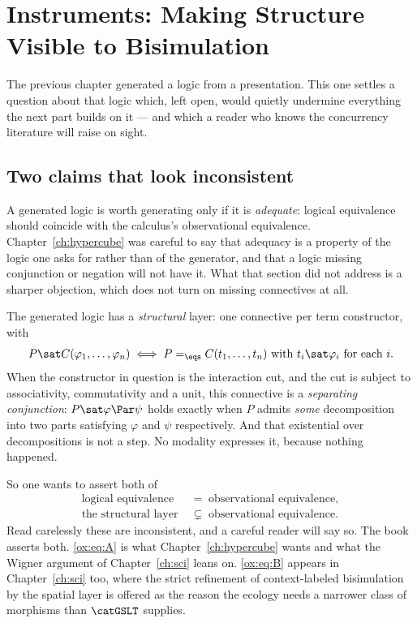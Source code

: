 \chapter{Instruments: Making Structure Visible to Bisimulation}
\label{ch:obsext}

The previous chapter generated a logic from a presentation. This one settles a
question about that logic which, left open, would quietly undermine everything the
next part builds on it --- and which a reader who knows the concurrency literature
will raise on sight.

\section{Two claims that look inconsistent}
\label{ox:sec:contradiction}

A generated logic is worth generating only if it is \emph{adequate}: logical
equivalence should coincide with the calculus's observational equivalence.
Chapter~\ref{ch:hypercube} was careful to say that adequacy is a property of the
logic one asks for rather than of the generator, and that a logic missing
conjunction or negation will not have it. What that section did not address is a
sharper objection, which does not turn on missing connectives at all.

The generated logic has a \emph{structural} layer: one connective per term
constructor, with
\[
  P \sat C(\varphi_1,\dots,\varphi_n)
  \iff
  P =_{\eqs} C(t_1,\dots,t_n) \text{ with } t_i \sat \varphi_i
  \text{ for each } i .
\]
When the constructor in question is the interaction cut, and the cut is subject to
associativity, commutativity and a unit, this connective is a \emph{separating
conjunction}: $P \sat \varphi \Par \psi$ holds exactly when $P$ admits
\emph{some} decomposition into two parts satisfying $\varphi$ and $\psi$
respectively. And that existential over decompositions is not a step. No modality
expresses it, because nothing happened.

So one wants to assert both of
\begin{align}
  \text{logical equivalence} \;&=\; \text{observational equivalence},
    \tag{A}\label{ox:eq:A}\\
  \text{the structural layer} \;&\subsetneq\; \text{observational equivalence}.
    \tag{B}\label{ox:eq:B}
\end{align}
Read carelessly these are inconsistent, and a careful reader will say so. The book
asserts both. \eqref{ox:eq:A} is what Chapter~\ref{ch:hypercube} wants and what the
Wigner argument of Chapter~\ref{ch:sci} leans on. \eqref{ox:eq:B} appears in
Chapter~\ref{ch:sci} too, where the strict refinement of context-labeled
bisimulation by the spatial layer is offered as the reason the ecology needs a
narrower class of morphisms than $\catGSLT$ supplies.


